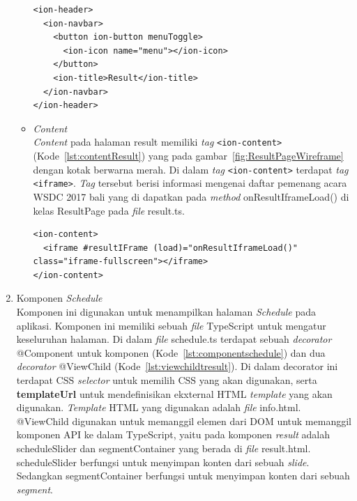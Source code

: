 \begin{enumerate}
\begin{itemize}
\newpage

\begin{lstlisting}[label={lst:headerResult}, caption=\textit{Header} pada result.html]
<ion-header>
  <ion-navbar>
    <button ion-button menuToggle>
      <ion-icon name="menu"></ion-icon>
    </button>
    <ion-title>Result</ion-title>
  </ion-navbar>
</ion-header>
\end{lstlisting}

		\item \textit{Content}\\
		\textit{Content} pada halaman result memiliki \textit{tag} \texttt{<ion-content>} (Kode~\ref{lst:contentResult}) yang pada gambar~\ref{fig:ResultPageWireframe} dengan kotak berwarna merah. Di dalam \textit{tag} \texttt{<ion-content>} terdapat \textit{tag} \texttt{<iframe>}. \textit{Tag} tersebut berisi informasi mengenai daftar pemenang acara WSDC 2017 bali yang di dapatkan pada \textit{method} onResultIframeLoad() di kelas ResultPage pada \textit{file} result.ts.
		
\begin{lstlisting}[label={lst:contentResult}, caption=\textit{Content} pada result.html]
<ion-content>
  <iframe #resultIFrame (load)="onResultIframeLoad()" class="iframe-fullscreen"></iframe>
</ion-content>
\end{lstlisting} 
	\end{itemize}
	
	\item Komponen \textit{Schedule}\\ 
	Komponen ini digunakan untuk menampilkan halaman \textit{Schedule} pada aplikasi. Komponen ini memiliki sebuah \textit{file} TypeScript untuk mengatur keseluruhan halaman. Di dalam \textit{file} schedule.ts terdapat sebuah \textit{decorator} @Component untuk komponen (Kode~\ref{lst:componentschedule}) dan dua \textit{decorator} @ViewChild (Kode~\ref{lst:viewchildtresult}). Di dalam decorator ini terdapat CSS \textit{selector} untuk memilih CSS yang akan digunakan, serta \textbf{templateUrl} untuk mendefinisikan ekxternal HTML \textit{template} yang akan digunakan. \textit{Template} HTML yang digunakan adalah \textit{file} info.html. @ViewChild digunakan untuk memanggil elemen dari DOM untuk memanggil komponen API ke dalam TypeScript, yaitu pada komponen \textit{result} adalah scheduleSlider dan segmentContainer yang berada di \textit{file} result.html. scheduleSlider berfungsi untuk menyimpan konten dari sebuah \textit{slide}. Sedangkan segmentContainer berfungsi untuk menyimpan konten dari sebuah \textit{segment}.
	

\end{enumerate}
